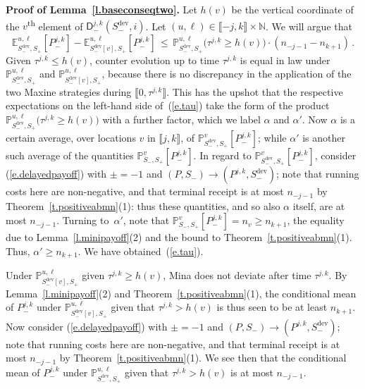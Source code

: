 \documentclass[letterpaper,11pt,oneside,reqno]{amsbook}
\newcommand{\PP}{\ensuremath{\mathbb{P}}}
\newcommand{\N}{\ensuremath{\mathbb{N}}}
\newcommand{\E}[0]{\mathbb{E}}
\numberwithin{figure}{chapter}
\theoremstyle{definition}
\theoremstyle{definition}
\theoremstyle{definition}
\theoremstyle{definition}
\theoremstyle{definition}
\newcommand{\nwithzero}{\N}
\newcommand\pgameplay[3]{\PP^{#3}_{#1,#2}}
\newcommand\egameplay[3]{\E^{#3}_{#1,#2}}
\newcommand{\sdev}{S_-^{\textrm{dev}}}
\begin{document}
 
 
{\bf Proof of Lemma~\ref{l.baseconseqtwo}.} Let $h(v)$ be the vertical coordinate of the $v$\textsuperscript{th} element of $\mathsf{D}_-^{j,k}(\sdev,i)$. 
Let $(u,\ell) \in \llbracket -j,k \rrbracket \times \nwithzero$.
We will argue that
\begin{equation}\label{e.tau}
\egameplay{\sdev}{S_+}{u,\ell}[P^{j,k}_-] - \egameplay{\sdev[v]}{S_+}{u,\ell}[P^{j,k}_-] \, \leq \, \pgameplay{\sdev}{S_+}{u,\ell} \big(\tau^{j,k} \geq h(v)\big) \cdot (n_{-j-1} - n_{k+1}) \, .
\end{equation}
Given $\tau^{j,k} \leq h(v)$, counter evolution up to time $\tau^{j,k}$ is equal in law under $\pgameplay{\sdev}{S_+}{u,\ell}$ and $\pgameplay{\sdev[v]}{S_+}{u,\ell}$, because there is no discrepancy in the application of the two Maxine strategies during $\llbracket 0, \tau^{j,k} \rrbracket$. This has the upshot that the respective expectations on the left-hand side of~(\ref{e.tau}) take the form 
 of the product $\pgameplay{\sdev}{S_+}{u,\ell} \big(\tau^{j,k} \geq h(v)\big)$ with a further factor, which we label $\alpha$ and $\alpha'$. Now $\alpha$ is a certain average, over locations $v$ in $\llbracket j,k \rrbracket$, of $\pgameplay{\sdev}{S_+}{v}[P^{j,k}_-]$; while $\alpha'$ is another such average of the quantities $\pgameplay{S_-}{S_+}{v}[P^{j,k}_-]$. 
In regard to  $\pgameplay{\sdev}{S_+}{v}[P^{j,k}_-]$, consider (\ref{e.delayedpayoff}) with $\pm = -1$ and $(P,S_-) \to (P^{j,k},\sdev)$; note that  running costs here are non-negative, and that terminal receipt is at most $n_{-j-1}$   by Theorem~\ref{t.positiveabmn}(1): thus these quantities, and so also $\alpha$ itself, are at most $n_{-j-1}$. Turning to~$\alpha'$, note that $\pgameplay{S_-}{S_+}{v}[P^{j,k}_-] = n_v \geq n_{k+1}$, the equality due to Lemma~\ref{l.minipayoff}(2) and the bound to Theorem~\ref{t.positiveabmn}(1). Thus, $\alpha' \geq n_{k+1}$. We have obtained~(\ref{e.tau}).


 Under
$\pgameplay{\sdev[v]}{S_+}{u,\ell}$ given $\tau^{j,k} \geq h(v)$, Mina does not deviate after time $\tau^{j,k}$. 
 By Lemma~\ref{l.minipayoff}(2) and Theorem~\ref{t.positiveabmn}(1),
 the conditional mean of $P^{j,k}_-$
under $\pgameplay{\sdev[v]}{S_+}{u,\ell}$ given that $\tau^{j,k} > h(v)$
 is thus seen to be at least $n_{k+1}$. 
Now  consider (\ref{e.delayedpayoff}) with $\pm = -1$ and $(P,S_-) \to (P^{j,k},\sdev)$; note that  running costs here are non-negative, and that terminal receipt is at most $n_{-j-1}$   by Theorem~\ref{t.positiveabmn}(1). We see then that
 the conditional mean of $P^{j,k}_-$
under $\pgameplay{\sdev}{S_+}{u,\ell}$ given that $\tau^{j,k} > h(v)$ is at most $n_{-j-1}$.
\end{document}
